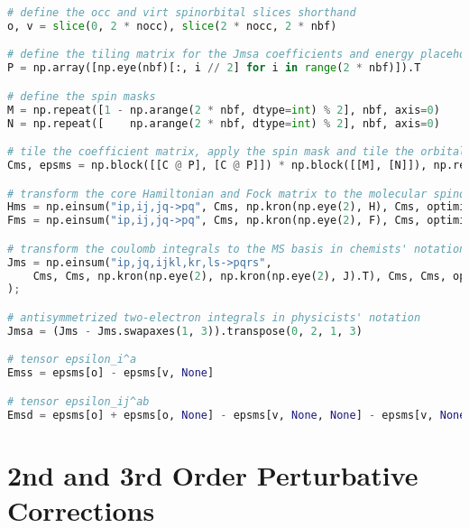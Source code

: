 \raggedbottom\begin{lstlisting}[language=Python, caption={Integral transform exercise code solution.}, label=code:int_solution]
# define the occ and virt spinorbital slices shorthand
o, v = slice(0, 2 * nocc), slice(2 * nocc, 2 * nbf)

# define the tiling matrix for the Jmsa coefficients and energy placeholders
P = np.array([np.eye(nbf)[:, i // 2] for i in range(2 * nbf)]).T

# define the spin masks
M = np.repeat([1 - np.arange(2 * nbf, dtype=int) % 2], nbf, axis=0)
N = np.repeat([    np.arange(2 * nbf, dtype=int) % 2], nbf, axis=0)

# tile the coefficient matrix, apply the spin mask and tile the orbital energies
Cms, epsms = np.block([[C @ P], [C @ P]]) * np.block([[M], [N]]), np.repeat(eps, 2)

# transform the core Hamiltonian and Fock matrix to the molecular spinorbital basis
Hms = np.einsum("ip,ij,jq->pq", Cms, np.kron(np.eye(2), H), Cms, optimize=True)
Fms = np.einsum("ip,ij,jq->pq", Cms, np.kron(np.eye(2), F), Cms, optimize=True)

# transform the coulomb integrals to the MS basis in chemists' notation
Jms = np.einsum("ip,jq,ijkl,kr,ls->pqrs",
    Cms, Cms, np.kron(np.eye(2), np.kron(np.eye(2), J).T), Cms, Cms, optimize=True
);

# antisymmetrized two-electron integrals in physicists' notation
Jmsa = (Jms - Jms.swapaxes(1, 3)).transpose(0, 2, 1, 3)

# tensor epsilon_i^a
Emss = epsms[o] - epsms[v, None]

# tensor epsilon_ij^ab
Emsd = epsms[o] + epsms[o, None] - epsms[v, None, None] - epsms[v, None, None, None]
\end{lstlisting}

\section{\texorpdfstring{2nd and 3rd Order Perturbative Corrections\label{sec:mp_code_solution}}{2nd and 3rd Order Perturbative Corrections}}

